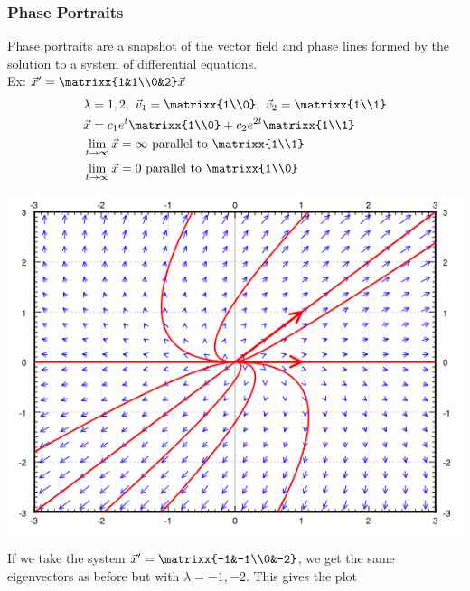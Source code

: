 \subsubsection{Phase Portraits}
Phase portraits are a snapshot of the vector field and phase lines formed by the solution to a system of differential equations.\\
Ex: $\vec{x}'=\matrixx{1&1\\0&2}\vec{x}$
\begin{align*}
    &\lambda=1,2,\ \vec{v}_1=\matrixx{1\\0},\ \vec{v}_2=\matrixx{1\\1}\\
    &\vec{x}=c_1e^{t}\matrixx{1\\0}+c_2e^{2t}\matrixx{1\\1}\\
    &\lim_{t\to\infty}\vec{x}=\infty\text{ parallel to }\matrixx{1\\1}\\
    &\lim_{t\to\infty}\vec{x}=0\text{ parallel to }\matrixx{1\\0}
\end{align*}
\centerline{\includegraphics[scale=0.8]{Images/ODEPictures/phasePortrait1.png}}
If we take the system $\vec{x}'=\matrixx{-1&-1\\0&-2}$, we get the same eigenvectors as before but with $\lambda=-1,-2$. This gives the plot\\
